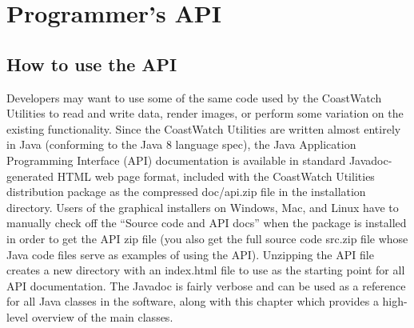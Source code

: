 \chapter{Programmer's API}
\label{api}

\section{How to use the API}

Developers may want to use some of the same code used by the
CoastWatch Utilities to read and write data, render images, or
perform some variation on the existing functionality.  Since the
CoastWatch Utilities are written almost entirely in Java
(conforming to the Java 8 language spec), the Java Application
Programming Interface (API) documentation is available in
standard Javadoc-generated HTML web page format, included with the
CoastWatch Utilities distribution package as the compressed
{\file doc/api.zip} file in the installation directory.  Users of
the graphical installers on Windows, Mac, and Linux
have to manually check off the ``Source code and API docs'' when
the package is installed in order to get the API zip file (you
also get the full source code {\file src.zip} file whose Java code
files serve as examples of using the API).  Unzipping the API
file creates a new directory with an {\file index.html} file to
use as the starting point for all API documentation.  The Javadoc
is fairly verbose and can be used as a reference for all Java
classes in the software, along with this chapter which provides a
high-level overview of the main classes.

